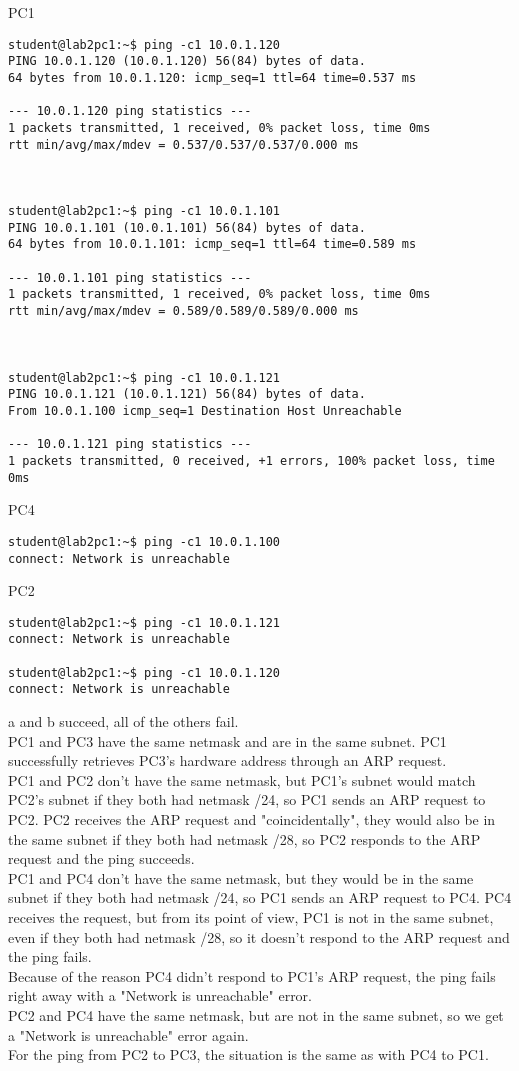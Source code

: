 \newpage
PC1
\begin{lstlisting}
student@lab2pc1:~$ ping -c1 10.0.1.120
PING 10.0.1.120 (10.0.1.120) 56(84) bytes of data.
64 bytes from 10.0.1.120: icmp_seq=1 ttl=64 time=0.537 ms

--- 10.0.1.120 ping statistics ---
1 packets transmitted, 1 received, 0% packet loss, time 0ms
rtt min/avg/max/mdev = 0.537/0.537/0.537/0.000 ms



student@lab2pc1:~$ ping -c1 10.0.1.101
PING 10.0.1.101 (10.0.1.101) 56(84) bytes of data.
64 bytes from 10.0.1.101: icmp_seq=1 ttl=64 time=0.589 ms

--- 10.0.1.101 ping statistics ---
1 packets transmitted, 1 received, 0% packet loss, time 0ms
rtt min/avg/max/mdev = 0.589/0.589/0.589/0.000 ms



student@lab2pc1:~$ ping -c1 10.0.1.121
PING 10.0.1.121 (10.0.1.121) 56(84) bytes of data.
From 10.0.1.100 icmp_seq=1 Destination Host Unreachable

--- 10.0.1.121 ping statistics ---
1 packets transmitted, 0 received, +1 errors, 100% packet loss, time 0ms
\end{lstlisting}

PC4
\begin{lstlisting}
student@lab2pc1:~$ ping -c1 10.0.1.100
connect: Network is unreachable
\end{lstlisting}

PC2
\begin{lstlisting}
student@lab2pc1:~$ ping -c1 10.0.1.121
connect: Network is unreachable

student@lab2pc1:~$ ping -c1 10.0.1.120
connect: Network is unreachable
\end{lstlisting}


a and b succeed, all of the others fail. \\

PC1 and PC3 have the same netmask and are in the same subnet. PC1 successfully retrieves PC3's hardware address through an ARP request. \\
PC1 and PC2 don't have the same netmask, but PC1's subnet would match PC2's subnet if they both had netmask /24, so PC1 sends an ARP request to PC2. PC2 receives the ARP request and "coincidentally", they would also be in the same subnet if they both had netmask /28, so PC2 responds to the ARP request and the ping succeeds. \\
PC1 and PC4 don't have the same netmask, but they would be in the same subnet if they both had netmask /24, so PC1 sends an ARP request to PC4. PC4 receives the request, but from its point of view, PC1 is not in the same subnet, even if they both had netmask /28, so it doesn't respond to the ARP request and the ping fails. \\
Because of the reason PC4 didn't respond to PC1's ARP request, the ping fails right away with a "Network is unreachable" error. \\
PC2 and PC4 have the same netmask, but are not in the same subnet, so we get a "Network is unreachable" error again. \\
For the ping from PC2 to PC3, the situation is the same as with PC4 to PC1.
